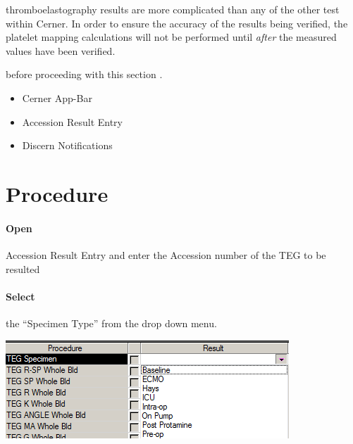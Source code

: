  thromboelastography results are more complicated than any of the other test within Cerner. In order to ensure the accuracy of the results being verified, the platelet mapping calculations will not be performed until \textit{after} the measured values have been verified.

\bigskip

 before proceeding with this section%
.
\begin{itemize}
   \item Cerner App-Bar
   \item Accession Result Entry
   \item Discern Notifications
 \end{itemize}

\section{Procedure}

\paragraph{Open} Accession Result Entry and enter the Accession number of the TEG to be resulted\\
\paragraph{Select} the ``Specimen Type'' from the drop down menu.\\
\vspace{.5em}
\begin{minipage}{\textwidth}

  \includegraphics[width=.8\textwidth, trim={0, 27px, 0, 0}, clip]{graphics/specimen_type}
\end{minipage}

\clearpage
